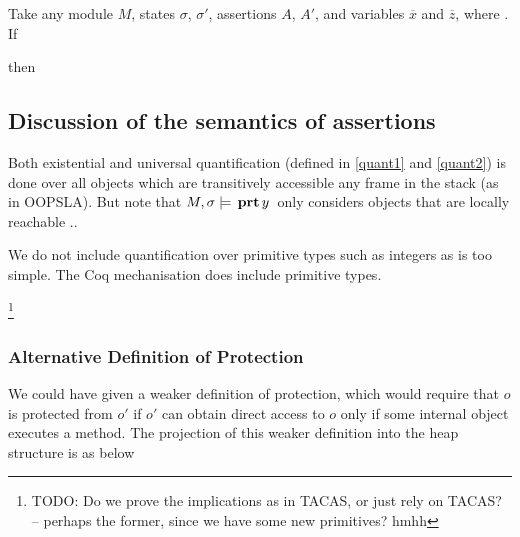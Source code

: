  
  \begin{lemma}
 \label{lemma:lowers}
Take any  module $M$, states $\sigma$, $\sigma'$, assertions $A$, $A'$,  
  and variables $\overline x$ and $\overline z$, where
. If 

 then
\end{lemma}
 


 
 \subsection{Discussion of the semantics of assertions}
 
 {Both existential and universal quantification (defined in \ref{quant1} and \ref{quant2}) is done over all objects which are transitively 
accessible any frame in the stack (as in OOPSLA). But note that $M , \sigma \models {\ensuremath{\, \mathbf{prt}}\, y\, }$ only considers objects that are locally reachable ..

We do not include quantification over primitive types such as integers as \LangOO is too simple. The 
Coq mechanisation does include primitive types.}
\footnote{TODO: Do we prove the implications as in TACAS, or just rely on TACAS? -- perhaps the former, since we have some new primitives? hmhh}

\subsubsection{Alternative Definition of Protection}

We could have given a weaker definition of protection, which would require that $o$ is protected from $o'$ if $o'$ can obtain direct access to $o$ only if some internal object executes a method. 
The projection of this weaker definition into the heap structure is as below



